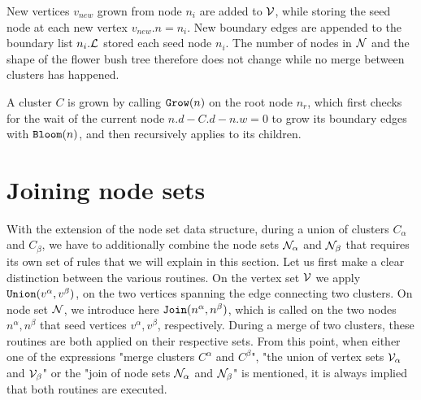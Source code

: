 New vertices $v_{new}$ grown from node $n_i$ are added to $\mathcal{V}$, while storing the seed node at each new vertex $v_{new}.n = n_i$. New boundary edges are appended to the boundary list $n_i.\mathcal{L}$ stored each seed node $n_i$. The number of nodes in $\mathcal{N}$ and the shape of the flower bush tree therefore does not change while no merge between clusters has happened.

\begin{theorem}\label{the:grownode}
  A cluster $C$ is grown by calling $\texttt{Grow}(n)$ on the root node $n_r$, which first checks for the wait of the current node $ n.d - C.d - n.w = 0$ to grow its boundary edges with $\texttt{Bloom}(n)$, and then recursively applies  to its children.
\end{theorem}

\begin{algo}[algotitle=Grow, label=al:bbgrow]
\begin{algorithm}[H]


\KwData{\node}

\BlankLine


\end{algorithm}
\end{algo}


\section{Joining node sets}\label{sec:jointnodesets}
With the extension of the node set data structure, during a union of clusters $C_\alpha$ and $C_\beta$, we have to additionally combine the node sets $\mathcal{N}_{\alpha}$ and $\mathcal{N}_\beta$ that requires its own set of rules that we will explain in this section. Let us first make a clear distinction between the various routines. On the vertex set $\mathcal{V}$ we apply $\texttt{Union}(v^\alpha, v^\beta)$, on the two vertices spanning the edge connecting two clusters. On node set $\mathcal{N}$, we introduce here $\texttt{Join}(n^\alpha, n^\beta)$, which is called on the two nodes $n^\alpha, n^\beta$ that seed vertices $v^\alpha, v^\beta$, respectively. During a merge of two clusters, these routines are both applied on their respective sets. From this point, when either one of the expressions "merge clusters $C^\alpha$ and $C^\beta$", "the union of vertex sets $\mathcal{V}_\alpha$ and $\mathcal{V}_\beta$" or the "join of node sets $\mathcal{N}_{\alpha}$ and $\mathcal{N}_\beta$" is mentioned, it is always implied that both routines are executed.

